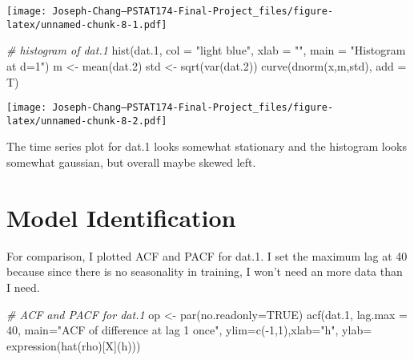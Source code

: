 \documentclass[
]{article}
\newenvironment{Shaded}{\begin{snugshade}}{\end{snugshade}}
\newcommand{\AttributeTok}[1]{\textcolor[rgb]{0.77,0.63,0.00}{#1}}
\newcommand{\CommentTok}[1]{\textcolor[rgb]{0.56,0.35,0.01}{\textit{#1}}}
\newcommand{\ConstantTok}[1]{\textcolor[rgb]{0.00,0.00,0.00}{#1}}
\newcommand{\DecValTok}[1]{\textcolor[rgb]{0.00,0.00,0.81}{#1}}
\newcommand{\FloatTok}[1]{\textcolor[rgb]{0.00,0.00,0.81}{#1}}
\newcommand{\FunctionTok}[1]{\textcolor[rgb]{0.00,0.00,0.00}{#1}}
\newcommand{\NormalTok}[1]{#1}
\newcommand{\OtherTok}[1]{\textcolor[rgb]{0.56,0.35,0.01}{#1}}
\newcommand{\SpecialCharTok}[1]{\textcolor[rgb]{0.00,0.00,0.00}{#1}}
\newcommand{\StringTok}[1]{\textcolor[rgb]{0.31,0.60,0.02}{#1}}
\begin{document}
\texttt{[image: Joseph-Chang---PSTAT174-Final-Project\_files/figure-latex/unnamed-chunk-8-1.pdf]}

\begin{Shaded}
\begin{Highlighting}[]
\CommentTok{\# histogram of dat.1}
\FunctionTok{hist}\NormalTok{(dat}\FloatTok{.1}\NormalTok{, }\AttributeTok{col =} \StringTok{"light blue"}\NormalTok{, }\AttributeTok{xlab =} \StringTok{""}\NormalTok{, }\AttributeTok{main =} \StringTok{"Histogram at d=1"}\NormalTok{)}
\NormalTok{m }\OtherTok{\textless{}{-}} \FunctionTok{mean}\NormalTok{(dat}\FloatTok{.2}\NormalTok{)}
\NormalTok{std }\OtherTok{\textless{}{-}} \FunctionTok{sqrt}\NormalTok{(}\FunctionTok{var}\NormalTok{(dat}\FloatTok{.2}\NormalTok{))}
\FunctionTok{curve}\NormalTok{(}\FunctionTok{dnorm}\NormalTok{(x,m,std), }\AttributeTok{add =}\NormalTok{ T)}
\end{Highlighting}
\end{Shaded}

\texttt{[image: Joseph-Chang---PSTAT174-Final-Project\_files/figure-latex/unnamed-chunk-8-2.pdf]}

The time series plot for dat.1 looks somewhat stationary and the
histogram looks somewhat gaussian, but overall maybe skewed left.

\hypertarget{model-identification}{%
\section{Model Identification}\label{model-identification}}

For comparison, I plotted ACF and PACF for dat.1. I set the maximum lag
at 40 because since there is no seasonality in training, I won't need an
more data than I need.

\begin{Shaded}
\begin{Highlighting}[]
\CommentTok{\# ACF and PACF for dat.1}
\NormalTok{op }\OtherTok{\textless{}{-}} \FunctionTok{par}\NormalTok{(}\AttributeTok{no.readonly=}\ConstantTok{TRUE}\NormalTok{)}
\FunctionTok{acf}\NormalTok{(dat}\FloatTok{.1}\NormalTok{, }\AttributeTok{lag.max =} \DecValTok{40}\NormalTok{, }\AttributeTok{main=}\StringTok{"ACF of difference at lag 1 once"}\NormalTok{, }\AttributeTok{ylim=}\FunctionTok{c}\NormalTok{(}\SpecialCharTok{{-}}\DecValTok{1}\NormalTok{,}\DecValTok{1}\NormalTok{),}\AttributeTok{xlab=}\StringTok{"h"}\NormalTok{, }\AttributeTok{ylab=} \FunctionTok{expression}\NormalTok{(}\FunctionTok{hat}\NormalTok{(rho)[X](h)))}
\end{Highlighting}
\end{Shaded}
\end{document}
